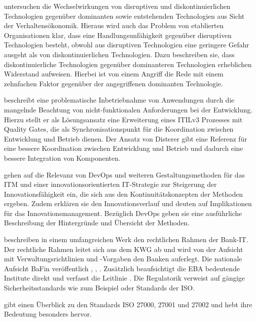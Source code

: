 \citet{Fernandez:2020} untersuchen die Wechselwirkungen von disruptiven und diskontinuierlichen Technologien gegenüber dominanten sowie entstehenden Technologien aus Sicht der Verhaltensökonomik. Hieraus wird auch das Problem von etablierten Organisationen klar, dass eine Handlungsunfähigkeit gegenüber disruptiven Technologien besteht, obwohl aus disruptiven Technologien eine geringere Gefahr ausgeht als von diskontinuierlichen Technologien. Dazu beschreiben sie, dass diskontinuierliche Technologien gegenüber dominanteren Technologien erheblichen Widerstand aufweisen. Hierbei ist von einem Angriff die Rede mit einem zehnfachen Faktor gegenüber der angegriffenen  dominanten Technologie.

\citet{mci/Disterer2011} beschreibt eine problematische Inbetriebnahme von Anwendungen durch die mangelnde Beachtung von nicht-funktionalen Anforderungen bei der Entwicklung. Hierzu stellt er als Lösungsansatz eine Erweiterung eines ITILv3 Prozesses mit Quality Gates, die als Synchronisationspunkt für die Koordination zwischen Entwicklung und Betrieb dienen. Der Ansatz von Disterer gibt eine Referenz für eine bessere Koordination zwischen Entwicklung und Betrieb und dadurch eine bessere Integration von Komponenten.

\citet{Alt2017} gehen auf die Relevanz von DevOps und weiteren Gestaltungsmethoden für das \ac{ITM} und einer innovationsorientierten IT-Strategie zur Steigerung der Innovationsfähigkeit ein, die sich aus den Kontinuitätskonzepten der Methoden ergeben. Zudem erklären sie den Innovationsverlauf und deuten auf Implikationen für das Innovationsmanagement. Bezüglich DevOps geben sie eine ausführliche Beschreibung der Hintergründe und Übersicht der Methoden.

\citet{recht/Bornemann2018} beschreiben in einem umfangreichen Werk den rechtlichen Rahmen der Bank-IT.
Der rechtliche Rahmen leitet sich aus dem \ac{KWG} ab und wird von der Aufsicht mit Verwaltungsrichtlinien und -Vorgaben den Banken auferlegt. Die nationale Aufsicht \ac{BaFin} veröffentlich \cite{MaRisk:2017}, \cite{MaRiskErläuterungen:2017}, \cite{BAIT:2018}. Zusätzlich beaufsichtigt die \ac{EBA} bedeutende Institute direkt und verfasst die Leitlinie \cite{eba:2019}. Die Regulatorik verweist auf gängige Sicherheitsstandards wie zum Beispiel \cite{IT-Grundschutz:2020} oder Standards der \ac{ISO}.

\citet{mci/Disterer2011} gibt einen Überblick zu den Standards \ac{ISO} 27000, 27001 und 27002 und hebt ihre Bedeutung besonders hervor.

